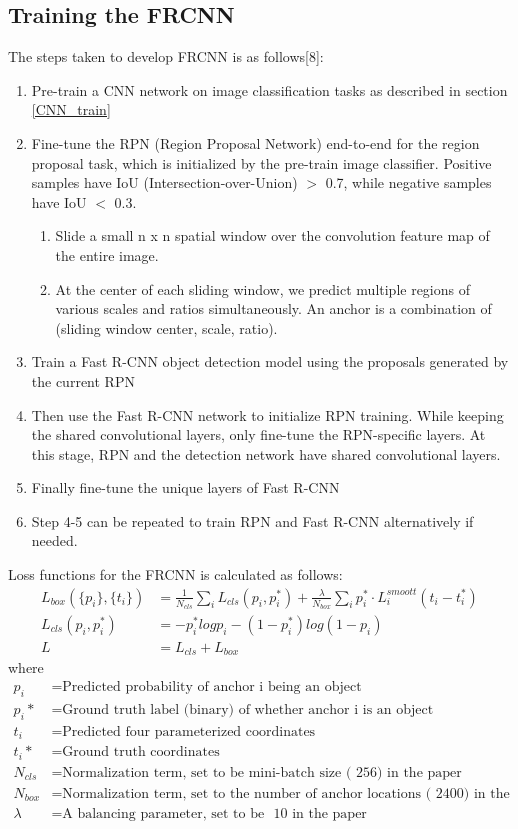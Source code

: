 \documentclass[12pt]{article}
\begin{document}
\subsection{Training the FRCNN}
The steps taken to develop FRCNN is as follows[8]:
\begin{enumerate}
	\item Pre-train a CNN network on image classification tasks as described in section \ref{CNN_train}
	\item Fine-tune the RPN (Region Proposal Network) end-to-end for the region proposal task, which is initialized by the pre-train image classifier. Positive samples have IoU (Intersection-over-Union) $>$ 0.7, while negative samples have IoU $<$ 0.3. 
	\begin{enumerate}
		\item Slide a small n x n spatial window over the convolution feature map of the entire image.
		\item At the center of each sliding window, we predict multiple regions of various scales and ratios simultaneously. An anchor is a combination of (sliding window center, scale, ratio). 
	\end{enumerate}
	\item Train a Fast R-CNN object detection model using the proposals generated by the current RPN
	\item Then use the Fast R-CNN network to initialize RPN training. While keeping the shared convolutional layers, only fine-tune the RPN-specific layers. At this stage, RPN and the detection network have shared convolutional layers.
	\item Finally fine-tune the unique layers of Fast R-CNN
	\item Step 4-5 can be repeated to train RPN and Fast R-CNN alternatively if needed.
\end{enumerate}

Loss functions for the FRCNN is calculated as follows:
\begin{align}
	L_{box}(\{p_i\},\{t_i\}) &= \frac{1}{N_{cls}}\sum_{i}{}L_{cls}(p_i, p_i^*) + \frac{\lambda}{N_{box}}\sum_{i}{}p_i^* \cdot L_i^{smoott}(t_i - t_i^*) \\	
	L_{cls}(p_i, p_i^*) &= -p_i^* logp_i - (1 - p_i^*)log(1 - p_i) \\
	L &= L_{cls} + L_{box}
\end{align} where 
\begin{align*}
	p_i &= \text{Predicted probability of anchor i being an object} \\
	p_i* &= \text{Ground truth label (binary) of whether anchor i is an object} \\
	t_i &= \text{Predicted four parameterized coordinates} \\
	t_i* &= \text{Ground truth coordinates} \\
	N_{cls} &= \text{Normalization term, set to be mini-batch size (~256) in the paper} \\
	N_{box} &= \text{Normalization term, set to the number of anchor locations (~2400) in the paper} \\
	\lambda &= \text{A balancing parameter, set to be ~10 in the paper } 
\end{align*}
\end{document}
